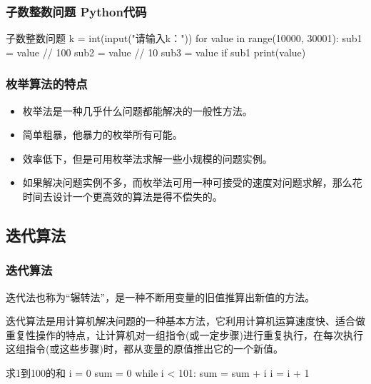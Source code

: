 \begin{frame}[fragile]
    \frametitle{子数整数问题 Python代码}
\begin{codeblock}{子数整数问题}
k = int(input("请输入k："))
for value in range(10000, 30001):
    sub1 = value // 100
    sub2 = value // 10 %
    sub3 = value %
    if sub1 %
        print(value)
\end{codeblock}
\end{frame}

\begin{frame}
    \frametitle{枚举算法的特点}
    \begin{itemize}
      \item 枚举法是一种几乎什么问题都能解决的一般性方法。
      \item 简单粗暴，他暴力的枚举所有可能。
      \item 效率低下，但是可用枚举法求解一些小规模的问题实例。
      \item 如果解决问题实例不多，而枚举法可用一种可接受的速度对问题求解，那么花时间去设计一个更高效的算法是得不偿失的。
    \end{itemize}
\end{frame}

\subsection{迭代算法}

\begin{frame}[fragile]
    \frametitle{迭代算法}
    迭代法也称为“辗转法”，是一种不断用变量的旧值推算出新值的方法。

    迭代算法是用计算机解决问题的一种基本方法，它利用计算机运算速度快、适合做重复性操作的特点，让计算机对一组指令(或一定步骤)进行重复执行，在每次执行这组指令(或这些步骤)时，都从变量的原值推出它的一个新值。

\begin{codeblock}{求1到100的和}
  i = 0
  sum = 0
  while i < 101:
      sum = sum + i
      i = i + 1
\end{codeblock}
    
\end{frame}


